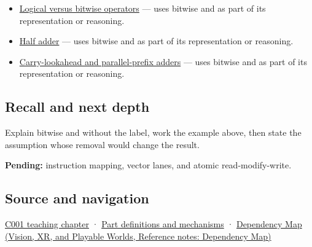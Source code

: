 \begin{itemize}
\tightlist
\item
  \hyperref[appendix-fe6b457d68d8]{Logical versus bitwise operators} --- uses bitwise and as part of its representation or reasoning.
\item
  \hyperref[appendix-1652d27a8e90]{Half adder} --- uses bitwise and as part of its representation or reasoning.
\item
  \hyperref[appendix-b5c46b2d94ff]{Carry-lookahead and parallel-prefix adders} --- uses bitwise and as part of its representation or reasoning.
\end{itemize}

\subsection{Recall and next depth}\label{appendix-68b52453737c-recall-and-next-depth}

\hypertarget{appendix-68b52453737c-recall-and-next-depth}{}

Explain bitwise and without the label, work the example above, then state the assumption whose removal would change the result.

\textbf{Pending:} instruction mapping, vector lanes, and atomic read-modify-write.

\subsection{Source and navigation}\label{appendix-68b52453737c-source-and-navigation}

\hypertarget{appendix-68b52453737c-source-and-navigation}{}

\hyperref[01-foundations-i-ch001-from-a-signal-to-an-interpretation]{C001 teaching chapter} · \hyperref[appendix-fd090d982a15]{Part definitions and mechanisms} · \href{../07-Vision-XR-and-Playable-Worlds/main.pdf\#nameddest=appendix-4ad47bdd269a}{Dependency Map (Vision, XR, and Playable Worlds, Reference notes: Dependency Map)}
